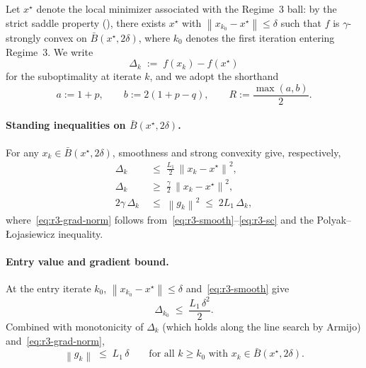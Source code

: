 \documentclass[11pt,a4paper]{article}
\theoremstyle{plain}
\theoremstyle{definition}
\newcommand{\norm}[1]{\left\|#1\right\|}
\newcommand{\xstar}{x^{\star}}
\newcommand{\Lone}{L_{1}}
\begin{document}
Let $\xstar$ denote the local minimizer associated with the Regime~3 ball: by the strict saddle property (), there exists $\xstar$ with $\norm{x_{k_{0}} - \xstar} \leq \delta$ such that $f$ is $\gamma$-strongly convex on $\bar B(\xstar, 2\delta)$, where $k_{0}$ denotes the first iteration entering Regime~3. We write
\begin{equation}\label{eq:r3-Delta}
\Delta_{k} \;:=\; f(x_{k}) - f(\xstar)
\end{equation}
for the suboptimality at iterate $k$, and we adopt the shorthand
\begin{equation}\label{eq:r3-abR}
a := 1 + p, \qquad b := 2(1 + p - q), \qquad R := \frac{\max(a, b)}{2}.
\end{equation}

\paragraph{Standing inequalities on $\bar B(\xstar, 2\delta)$.}
For any $x_{k} \in \bar B(\xstar, 2\delta)$, smoothness and strong convexity give, respectively,
\begin{align}
\Delta_{k} &\;\leq\; \tfrac{\Lone}{2}\,\norm{x_{k} - \xstar}^{2}, \label{eq:r3-smooth}\\
\Delta_{k} &\;\geq\; \tfrac{\gamma}{2}\,\norm{x_{k} - \xstar}^{2}, \label{eq:r3-sc}\\
2\gamma\,\Delta_{k} &\;\leq\; \norm{g_{k}}^{2} \;\leq\; 2\Lone\,\Delta_{k}, \label{eq:r3-grad-norm}
\end{align}
where~\eqref{eq:r3-grad-norm} follows from~\eqref{eq:r3-smooth}--\eqref{eq:r3-sc} and the Polyak--{\L}ojasiewicz inequality.

\paragraph{Entry value and gradient bound.}
At the entry iterate $k_{0}$, $\norm{x_{k_{0}} - \xstar} \leq \delta$ and~\eqref{eq:r3-smooth} give
\begin{equation}\label{eq:r3-entry}
\Delta_{k_{0}} \;\leq\; \frac{\Lone\,\delta^{2}}{2}.
\end{equation}
Combined with monotonicity of $\Delta_{k}$ (which holds along the line search by Armijo) and~\eqref{eq:r3-grad-norm},
\begin{equation}\label{eq:r3-grad-bound}
\norm{g_{k}} \;\leq\; \Lone\,\delta \qquad \text{for all } k \geq k_{0} \text{ with } x_{k} \in \bar B(\xstar, 2\delta).
\end{equation}
\end{document}
